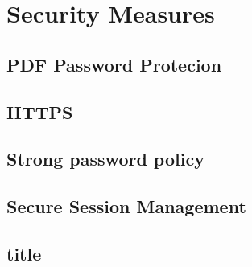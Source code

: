 \chapter{Security Measures}

\section{PDF Password Protecion}
\section{HTTPS}
\section{Strong password policy}
\section{Secure Session Management}
\section{title}
